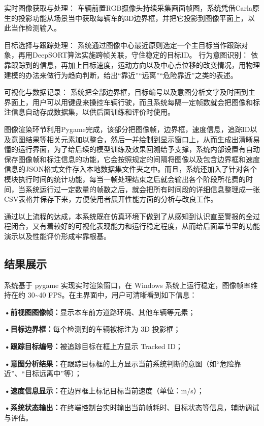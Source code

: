 实时图像获取与处理： 车辆前置RGB摄像头持续采集画面帧图，系统凭借Carla原生的投影功能从场景当中获取每辆车的3D边界框，并把它投影到图像平面上，以此当作检测输入。

目标选择与跟踪处理： 系统通过图像中心最近原则选定一个主目标当作跟踪对象，再用DeepSORT算法实施跨帧关联，守住稳定的目标ID。
行为意图识别： 依靠跟踪到的信息，再加上目标速度，运动方向以及中心点位移的改变情况，用物理建模的办法来做行为趋向判断，给出“靠近”“远离”“危险靠近”之类的表述。

可视化与数据记录： 系统把全部边界框，目标编号以及意图分析文字及时画到主界面上，用户可以用键盘来操控车辆行驶，而且系统每隔一定帧数就会把图像和标注信息自动存成数据集，以供后面训练和评价时使用。

图像渲染环节利用Pygame完成，该部分把图像帧，边界框，速度信息，追踪ID以及意图结果等相关元素加以整合，然后一并绘制到显示窗口上，从而生成出清晰易懂的运行界面，为了给后续的模型训练及效果回溯给予支撑，系统内部设置有自动保存图像帧和标注信息的功能，它会按照规定的间隔将图像以及包含边界框和速度信息的JSON格式文件存入本地数据集文件夹之中。而且，系统还加入了针对各个模块执行时间的统计功能，每当一帧处理结束之后就会输出各个阶段所花费的时间，当系统运行过一定数量的帧数之后，就会把所有时间段的详细信息整理成一张CSV表格并保存下来，方便使用者展开性能方面的分析与改良工作。

通过以上流程的达成，本系统既在仿真环境下做到了从感知到认识直至警报的全过程闭合，又有着较好的可视化表现能力和运行稳定程度，从而给后面章节里的功能演示以及性能评价形成牢靠根基。

\subsection{结果展示}

系统基于 pygame 实现实时渲染窗口，在 Windows 系统上运行稳定，图像帧率维持在约 30\textasciitilde40 FPS。在主界面中，用户可清晰看到如下信息：

\textbf{•前视图图像帧：}显示本车前方道路环境、其他车辆等元素；

\textbf{•目标边界框：}每个检测到的车辆被标注为 3D 投影框；

\textbf{•跟踪目标编号：}被追踪目标在框上方显示 Tracked ID；

\textbf{•意图分析结果：}在跟踪目标框的上方显示当前系统判断的意图（如“危险靠近”、“目标远离中”等）；

\textbf{•速度信息显示：}在边界框上标记目标当前速度（单位：m/s）；

\textbf{•系统状态输出：}在终端控制台实时输出当前帧耗时、目标状态等信息，辅助调试与评估。

